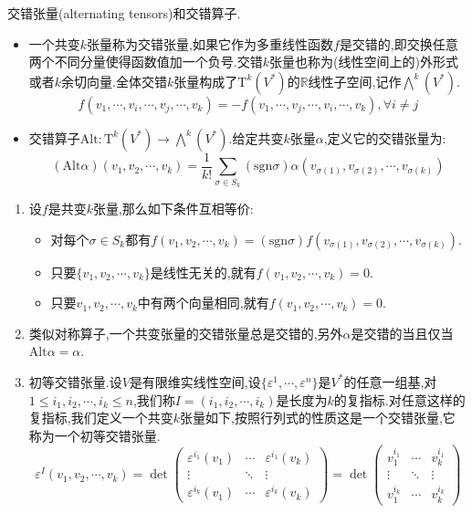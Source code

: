 交错张量(alternating tensors)和交错算子.
\begin{itemize}
	\item 一个共变$k$张量称为交错张量,如果它作为多重线性函数$f$是交错的,即交换任意两个不同分量使得函数值加一个负号.交错$k$张量也称为(线性空间上的)外形式或者$k$余切向量.全体交错$k$张量构成了$\mathrm{T}^k(V^*)$的$\mathbb{R}$线性子空间,记作$\bigwedge^k(V^*)$.
	$$f(v_1,\cdots,v_i,\cdots,v_j,\cdots,v_k)=-f(v_1,\cdots,v_j,\cdots,v_i,\cdots,v_k),\forall i\not=j$$
	\item 交错算子$\mathrm{Alt}:\mathrm{T}^k(V^*)\to\bigwedge^k(V^*)$.给定共变$k$张量$\alpha$,定义它的交错张量为:
	$$(\mathrm{Alt}\alpha)(v_1,v_2,\cdots,v_k)=\frac{1}{k!}\sum_{\sigma\in S_k}(\mathrm{sgn}\sigma)\alpha(v_{\sigma(1)},v_{\sigma(2)},\cdots,v_{\sigma(k)})$$
\end{itemize}
\begin{enumerate}
	\item 设$f$是共变$k$张量,那么如下条件互相等价:
	\begin{itemize}
		\item 对每个$\sigma\in S_k$都有$f(v_1,v_2,\cdots,v_k)=(\mathrm{sgn}\sigma)f(v_{\sigma(1)},v_{\sigma(2)},\cdots,v_{\sigma(k)})$.
		\item 只要$\{v_1,v_2,\cdots,v_k\}$是线性无关的,就有$f(v_1,v_2,\cdots,v_k)=0$.
		\item 只要$v_1,v_2,\cdots,v_k$中有两个向量相同,就有$f(v_1,v_2,\cdots,v_k)=0$.
	\end{itemize}
	\item 类似对称算子,一个共变张量的交错张量总是交错的,另外$\alpha$是交错的当且仅当$\mathrm{Alt}\alpha=\alpha$.
	\item 初等交错张量.设$V$是有限维实线性空间,设$\{\varepsilon^1,\cdots,\varepsilon^n\}$是$V^*$的任意一组基,对$1\le i_1,i_2,\cdots,i_k\le n$,我们称$I=(i_1,i_2,\cdots,i_k)$是长度为$k$的复指标.对任意这样的复指标,我们定义一个共变$k$张量如下,按照行列式的性质这是一个交错张量,它称为一个初等交错张量.
	$$\varepsilon^I(v_1,v_2,\cdots,v_k)=\det\left(\begin{array}{ccc}\varepsilon^{i_1}(v_1)&\cdots&\varepsilon^{i_1}(v_k)\\\vdots&\ddots&\vdots\\\varepsilon^{i_k}(v_1)&\cdots&\varepsilon^{i_k}(v_k)\end{array}\right)=\det\left(\begin{array}{ccc}v_1^{i_1}&\cdots&v_k^{i_1}\\\vdots&\ddots&\vdots\\v_1^{i_k}&\cdots&v_k^{i_k}\end{array}\right)$$

\end{enumerate}
